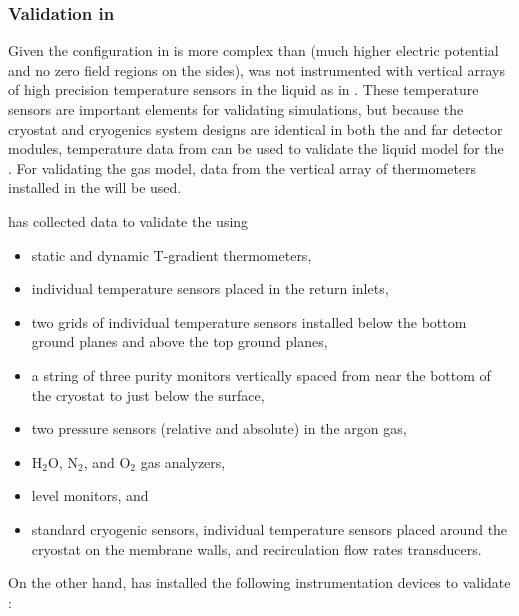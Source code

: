 \subsubsection{Validation in }
\label{sec:pddp-cfd-valid}


Given the  configuration in  is more complex than  (much higher electric potential and no zero field regions on the  sides),  was not instrumented with vertical arrays of high precision temperature sensors in the liquid as in . These temperature sensors are important elements for validating  simulations, but because the cryostat and cryogenics system designs are identical in both the  and  far detector modules, temperature data from  can be used to validate the liquid model for the  . 
For validating the gas model, data from the vertical array of thermometers installed in the  will be used. 

 has collected data to validate the  using %
\begin{itemize}
\item static and dynamic T-gradient thermometers, 
\item individual temperature sensors placed in the return \lar inlets, 
\item two \twod grids of individual temperature sensors installed below the bottom ground planes and above the top ground planes, 
\item a string of three purity monitors vertically spaced from near the bottom of the cryostat to just below the \lar surface,
\item two pressure sensors (relative and absolute) in the argon gas,
\item H$_{2}$O, N$_{2}$, and O$_{2}$ gas analyzers, 
\item {} level monitors, and
\item standard cryogenic sensors, %
individual temperature sensors placed around
the cryostat on the membrane walls, and recirculation flow rates transducers.
\end{itemize}

On the other hand,  has installed the following instrumentation devices to validate :


